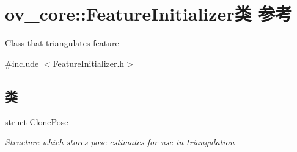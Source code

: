 \hypertarget{classov__core_1_1FeatureInitializer}{}\section{ov\+\_\+core\+:\+:Feature\+Initializer类 参考}
\label{classov__core_1_1FeatureInitializer}


Class that triangulates feature  




{\ttfamily \#include $<$Feature\+Initializer.\+h$>$}

\subsection*{类}
\begin{DoxyCompactItemize}
\item 
struct \hyperlink{structov__core_1_1FeatureInitializer_1_1ClonePose}{Clone\+Pose}
\begin{DoxyCompactList}\small\item\em Structure which stores pose estimates for use in triangulation \end{DoxyCompactList}\end{DoxyCompactItemize}
